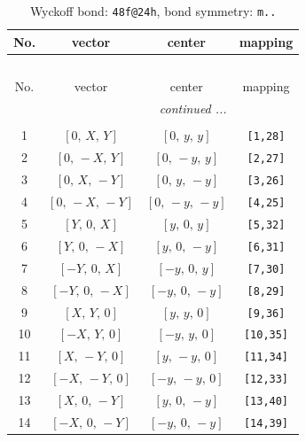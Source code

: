 \documentclass[fleqn,8pt]{jsarticle}
\begin{document}
\begin{longtable}{cccc}
\caption{Wyckoff bond: {\tt 48f@24h}, bond symmetry: {\tt m..}}
 \\
 \hline \hline
No. & vector & center & mapping \\ \hline \endfirsthead

\multicolumn{3}{l}{\tablename\ \thetable{}} \\
 \hline \hline
No. & vector & center & mapping \\ \hline \endhead

 \hline \hline
\multicolumn{3}{r}{\footnotesize\it continued ...} \\ \endfoot

 \hline \hline
\multicolumn{3}{r}{} \\ \endlastfoot

1 & $\left[ 0,\, X,\, Y \right]$ & $\left[ 0,\, y,\, y \right]$ & {\tt [1,28]} \\ \hline
2 & $\left[ 0,\, - X,\, Y \right]$ & $\left[ 0,\, - y,\, y \right]$ & {\tt [2,27]} \\ \hline
3 & $\left[ 0,\, X,\, - Y \right]$ & $\left[ 0,\, y,\, - y \right]$ & {\tt [3,26]} \\ \hline
4 & $\left[ 0,\, - X,\, - Y \right]$ & $\left[ 0,\, - y,\, - y \right]$ & {\tt [4,25]} \\ \hline
5 & $\left[ Y,\, 0,\, X \right]$ & $\left[ y,\, 0,\, y \right]$ & {\tt [5,32]} \\ \hline
6 & $\left[ Y,\, 0,\, - X \right]$ & $\left[ y,\, 0,\, - y \right]$ & {\tt [6,31]} \\ \hline
7 & $\left[ - Y,\, 0,\, X \right]$ & $\left[ - y,\, 0,\, y \right]$ & {\tt [7,30]} \\ \hline
8 & $\left[ - Y,\, 0,\, - X \right]$ & $\left[ - y,\, 0,\, - y \right]$ & {\tt [8,29]} \\ \hline
9 & $\left[ X,\, Y,\, 0 \right]$ & $\left[ y,\, y,\, 0 \right]$ & {\tt [9,36]} \\ \hline
10 & $\left[ - X,\, Y,\, 0 \right]$ & $\left[ - y,\, y,\, 0 \right]$ & {\tt [10,35]} \\ \hline
11 & $\left[ X,\, - Y,\, 0 \right]$ & $\left[ y,\, - y,\, 0 \right]$ & {\tt [11,34]} \\ \hline
12 & $\left[ - X,\, - Y,\, 0 \right]$ & $\left[ - y,\, - y,\, 0 \right]$ & {\tt [12,33]} \\ \hline
13 & $\left[ X,\, 0,\, - Y \right]$ & $\left[ y,\, 0,\, - y \right]$ & {\tt [13,40]} \\ \hline
14 & $\left[ - X,\, 0,\, - Y \right]$ & $\left[ - y,\, 0,\, - y \right]$ & {\tt [14,39]} \\ \hline

\end{longtable}
\end{document}
